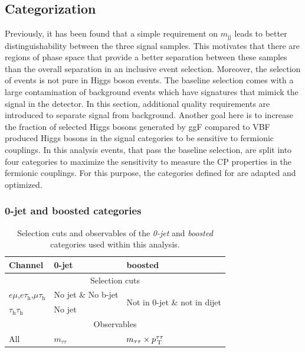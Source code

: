 \subsection{Categorization}\label{sec:categorization}
Previously, it has been found that a simple requirement on $m_\text{jj}$ leads to better distinguishability between the three signal samples. 
This motivates that there are regions of phase space that provide a better separation between these samples than the overall separation in an inclusive event selection. Moreover, the selection of 
events is not pure in Higgs boson events. The baseline selection comes with a large contamination of background events which have signatures that mimick the signal in the detector. In this section, additional quality requirements are introduced to separate signal from background.
Another goal here is to increase the fraction of selected Higgs bosons generated by ggF compared to VBF produced Higgs bosons in the signal categories to be sensitive to fermionic couplings.
In this analysis events, that pass the baseline selection, are split into four categories to maximize the sensitivity to measure the CP properties in the fermionic couplings. 
For this purpose, the categories defined for \cite{Sirunyan:2017khh} are adapted and optimized.

\subsubsection{0-jet and boosted categories}

\begin{table}[!]
    \centering
    \caption[Selection cuts \textit{0-jet} and \textit{boosted} categories.]{Selection cuts and observables of the \textit{0-jet} and \textit{boosted} categories used within this analysis.}\label{ES:categorization_0jet1jet}
    \begin{tabular}{lll}
        \toprule
        Channel         & 0-jet         & boosted    \\ \midrule
        \multicolumn{3}{c}{Selection cuts}                                                       \\ \hline
        $e\mu$,$e\tau_\text{h}$,$\mu\tau_\text{h}$           & No jet \& No b-jet  &  \multirow{2}{*}{Not in 0-jet \& not in dijet}        \\                
        $\tau_\text{h}\tau_\text{h}$  &  No jet                                 &          \\\midrule     
        \multicolumn{3}{c}{Observables}                                         \\ \midrule
        All          &  $m_{\tau\tau}$                            &  $m_{\tau\tau}\times p_\text{\,T}^{\tau\tau}$  \\    \bottomrule                                                                         
    \end{tabular}
\end{table}

